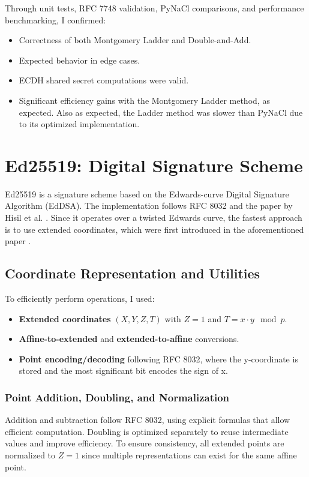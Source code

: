 \documentclass[twoside,a4paper,12pt]{article}
\begin{document}
Through unit tests, RFC 7748 validation, PyNaCl comparisons, and performance benchmarking, I confirmed:
\begin{itemize}
    \item Correctness of both Montgomery Ladder and Double-and-Add.
    \item Expected behavior in edge cases.
    \item ECDH shared secret computations were valid.
    \item Significant efficiency gains with the Montgomery Ladder method, as expected. Also as expected, the Ladder method was slower than PyNaCl due to its optimized implementation.
\end{itemize}

\section{Ed25519: Digital Signature Scheme}
\label{sec:ed25519}

Ed25519 is a signature scheme based on the Edwards-curve Digital Signature Algorithm (EdDSA). The implementation follows RFC 8032 \cite{rfc8032} and the paper by Hisil et al.\cite{revisited} . Since it operates over a twisted Edwards curve, the fastest approach is to use extended coordinates, which were first introduced in the aforementioned paper \cite{revisited}.

\subsection{Coordinate Representation and Utilities}
To efficiently perform operations, I used:
\begin{itemize}
    \item \textbf{Extended coordinates} $(X, Y, Z, T)$ with $Z = 1$ and $T = x \cdot y \mod p$.
    \item \textbf{Affine-to-extended} and \textbf{extended-to-affine} conversions.
    \item \textbf{Point encoding/decoding} following RFC 8032, where the y-coordinate is stored and the most significant bit encodes the sign of x.
\end{itemize}

\subsubsection{Point Addition, Doubling, and Normalization}
Addition and subtraction follow RFC 8032, using explicit formulas that allow efficient computation. Doubling is optimized separately to reuse intermediate values and improve efficiency. To ensure consistency, all extended points are normalized to $Z = 1$ since multiple representations can exist for the same affine point.
\end{document}
